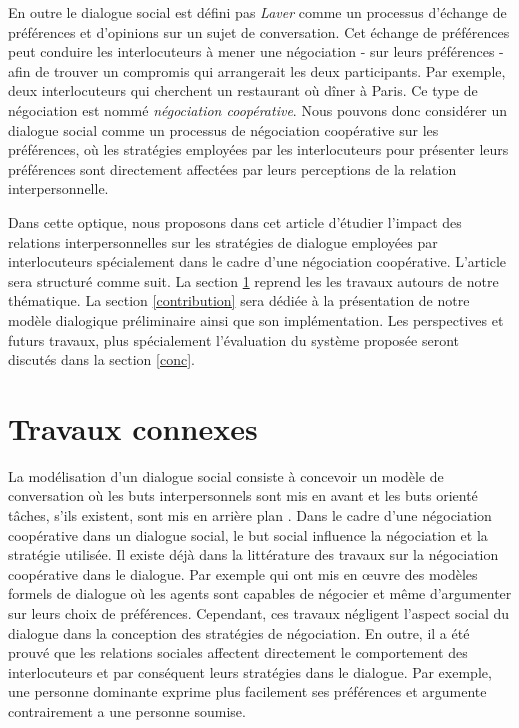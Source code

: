 \documentclass [french]{sig-alternate-05-2015}
\begin{document}
 \par En outre le dialogue social est défini pas \emph{Laver}\cite{laver1981linguistic} comme un processus d'échange de préférences et d'opinions sur un sujet de conversation. Cet échange de préférences peut conduire les interlocuteurs à mener une négociation - sur leurs préférences - afin de trouver un compromis qui arrangerait les deux participants. Par exemple, deux interlocuteurs qui cherchent un restaurant où dîner à Paris. Ce type de négociation est nommé \emph{négociation coopérative}. Nous pouvons donc considérer un dialogue social comme un processus de négociation coopérative sur les préférences, où les stratégies employées par les interlocuteurs pour présenter leurs préférences sont directement affectées par leurs perceptions de la relation interpersonnelle.

\par Dans cette optique, nous proposons dans cet article d'étudier l'impact des relations interpersonnelles sur les stratégies de dialogue employées par interlocuteurs spécialement dans le cadre d'une négociation coopérative. L'article sera structuré comme suit. La section \ref{RW} reprend les les travaux autours de notre thématique. La section \ref{contribution} sera dédiée à la présentation de notre modèle dialogique préliminaire ainsi que son implémentation. Les perspectives et futurs travaux, plus spécialement l'évaluation du système proposée seront discutés dans la section \ref{conc}.

\section{Travaux connexes}
\label{RW}
  
La modélisation d'un dialogue social consiste à concevoir un modèle de conversation où les buts interpersonnels sont mis en avant et les buts orienté tâches, s'ils existent, sont mis en arrière plan \cite{bickmore2005social}. Dans le cadre d'une négociation coopérative dans un dialogue social, le but social influence la négociation et la stratégie utilisée. Il existe déjà dans la littérature des travaux sur la négociation coopérative dans le dialogue. Par exemple \cite{amgoud2000arguments, daskalopulu1998handling} qui ont mis en œuvre des modèles formels de dialogue où les agents sont capables de négocier et même d'argumenter sur leurs choix de préférences. Cependant, ces travaux négligent l'aspect social du dialogue dans la conception des stratégies de négociation. En outre, il a été prouvé que les relations sociales affectent directement le comportement des interlocuteurs \cite{bickmore2000weather, bickmore2005establishing, moon1998intimate, nass2000does} et par conséquent leurs stratégies dans le dialogue. Par exemple, une personne dominante exprime plus facilement ses préférences et argumente contrairement a une personne soumise. 
\end{document}
